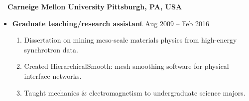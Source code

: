 ~~{\color{black}\textbf{Carneige Mellon University} \hfill  \textbf{Pittsburgh, PA, USA}}\par
\begin{itemize}
    \item
        \textbf{Graduate teaching/research assistant}
        \hfill  {Aug 2009 -- Feb 2016} \par
        \begin{enumerate}
            \item Dissertation on mining meso-scale materials physics from high-energy synchrotron data.
            \item Created HierarchicalSmooth: mesh smoothing software for physical interface networks. 
            \item Taught mechanics \& electromagnetism to undergraduate science majors.
        \end{enumerate}
\end{itemize}